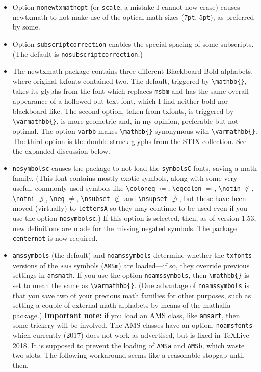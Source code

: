 \documentclass[11pt]{article}
\theoremstyle{oldplain}
\theoremstyle{plain}
\begin{document}
\begin{itemize}
\item Option {\tt nonewtxmathopt} (or {\tt scale}, a mistake I cannot now erase) causes newtxmath to not make use of the optical math sizes (7{\tt pt}, 5{\tt pt}), as preferred by some.
\item Option {\tt subscriptcorrection} enables the special spacing of some subscripts. (The default is {\tt nosubscriptcorrection}.)
\item The \textsf{newtxmath} package contains three different Blackboard Bold alphabets, where original \textsf{txfonts} contained two. The default, triggered by \verb|\mathbb{}|, takes its glyphs from the font which replaces {\tt msbm} and has the same overall appearance of a hollowed-out text font, which I find neither bold nor blackboard-like. The second option, taken from \textsf{txfonts}, is triggered by \verb|\varmathbb{}|, is more geometric and, in my opinion, preferable but not optimal. The option {\tt varbb} makes \verb|\mathbb{}| synonymous with \verb|\varmathbb{}|. The third option is the double-struck glyphs from the STIX collection. See the expanded discussion below.
\item {\tt nosymbolsc} causes the package to not load the {\tt symbolsC} fonts, saving  a math family. (This font contains mostly exotic symbols, along with some very useful, commonly used symbols like \verb|\coloneq| $\coloneq$, \verb|\eqcolon| $\eqcolon$, \verb|\notin| $\notin$, \verb|\notni| $\notni$, \verb|\neq| $\neq$, \verb|\nsubset| $\nsubset$ and \verb|\nsupset| $\nsupset$, but these have been moved (virtually) to {\tt lettersA} so they may continue to be used even if you use the option {\tt nosymbolsc}.) If this option is selected, then, as of version 1.53, new definitions are made for the missing negated symbols. The package {\tt centernot} is now required.
\item {\tt amssymbols} (the default) and {\tt noamssymbols} determine whether the {\tt txfonts} versions of the \textsc{ams} symbols ({\tt AMSm}) are loaded---if so, they override previous settings in {\tt amsmath}. If you use the option {\tt noamssymbols}, then \verb|\mathbb{}| is set to mean the same as \verb|\varmathbb{}|. (One advantage of {\tt noamssymbols} is that you save two of your precious math families for other purposes, such as setting a couple of external math alphabets by means of the \textsf{mathalfa} package.) \textbf{Important note:} if you load an AMS class, like {\tt amsart}, then some trickery will be involved. The AMS classes have an option, {\tt noamsfonts} which currently (2017) does not work as advertised, but is fixed in \TeX Live 2018. It is supposed to prevent the loading of {\tt AMSa} and {\tt AMSb}, which waste two slots. The following workaround seems like a reasonable stopgap until then.

\end{itemize}
\end{document}
